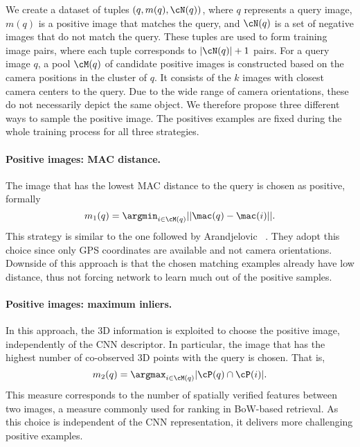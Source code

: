 We create a dataset of tuples $\left(q, m(q), \cN(q)\right)$, where $q$ represents a query image, $m(q)$ is a positive image that matches the query, and $\cN(q)$ is a set of negative images that do not match the query.
These tuples are used to form training image pairs, where each tuple corresponds to $|\cN(q)|+1$ pairs. 
For a query image $q$, a pool $\cM(q)$ of candidate positive images is constructed based on the camera positions in the cluster of $q$.
It consists of the $k$ images with closest camera centers to the query.
Due to the wide range of camera orientations, these do not necessarily depict the same object. 
We therefore propose three different ways to sample the positive image.
The positives examples are fixed during the whole training process for all three strategies.
%

\paragraph{Positive images: MAC distance.} 
The image that has the lowest MAC distance to the query is chosen as positive, formally
%
\begin{equation}
m_1(q) = \argmin_{i \in \cM(q)} ||\mac(q)-\mac(i)||.
\label{equ:mac_pos}
\end{equation} 
%
This strategy is similar to the one followed by Arandjelovic \etal~\cite{AGTPS15}. 
They adopt this choice since only GPS coordinates are available and not camera orientations.
Downside of this approach is that the chosen matching examples already have low distance, thus not forcing network to learn much out of the positive samples.


\paragraph{Positive images: maximum inliers.} 
%
In this approach, the 3D information is exploited to choose the positive image, independently of the CNN descriptor. In particular, the image that has the highest number of co-observed 3D points with the query is chosen.
That is, 
%
\begin{equation}
\label{equ:ninl_pos}
m_2(q) = \argmax_{i \in \cM(q)} |\cP(q) \cap \cP(i)|.
\end{equation} 
%
This measure corresponds to the number of spatially verified features between two images, a measure commonly used for ranking in BoW-based retrieval. As this choice is independent of the CNN representation, it delivers more challenging positive examples.
%

